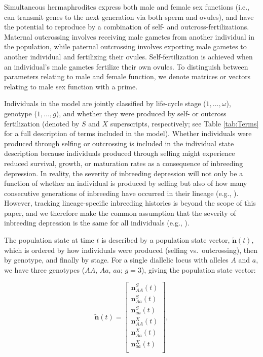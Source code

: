 \documentclass[11pt,draft]{article}
\def\mbf#1{\mathbf{#1}}
\begin{document}
Simultaneous hermaphrodites express both male and female sex functions (i.e., can transmit genes to the next generation via both sperm and ovules), and have the potential to reproduce by a combination of self- and outcross-fertilizations. Maternal outcrossing involves receiving male gametes from another individual in the population, while paternal outcrossing involves exporting male gametes to another individual and fertilizing their ovules. Self-fertilization is achieved when an individual's male gametes fertilize their own ovules. To distinguish between parameters relating to male and female function, we denote matrices or vectors relating to male sex function with a prime. 

Individuals in the model are jointly classified by life-cycle stage ($1, \ldots, \omega$), genotype ($1, \ldots, g$), and whether they were produced by self- or outcross fertilization (denoted by $S$ and $X$ superscripts, respectively; see Table \ref{tab:Terms} for a full description of terms included in the model). Whether individuals were produced through selfing or outcrossing is included in the individual state description because individuals produced through selfing might experience reduced survival, growth, or maturation rates as a consequence of inbreeding depression. In reality, the severity of inbreeding depression will not only be a function of whether an individual is produced by selfing but also of how many consecutive generations of inbreeding have occurred in their lineage (e.g., \citealt{kelly1999response, kelly2007mutation}). However, tracking lineage-specific inbreeding histories is beyond the scope of this paper, and we therefore make the common assumption that the severity of inbreeding depression is the same for all individuals (e.g., \citealt{Charlesworth1987, Charlesworth2009, Charlesworth2010,JordanConnallon2014}).

The population state at time $t$ is described by a population state vector, $\tilde{\mbf{n}}(t)$, which is ordered by how individuals were produced (selfing vs.~outcrossing), then by genotype, and finally by stage. For a single diallelic locus with alleles $A$ and $a$, we have three genotypes ($AA,\, Aa,\, aa$; $g = 3$), giving the population state vector:
\begin{linenomath*}
\begin{equation} \label{eq:PopStateVec}
	\tilde{\mbf{n}}(t) =  \left[
								\begin{array}{c}
									\mbf{n}^{S}_{AA}(t) \\
									\mbf{n}^{S}_{Aa}(t) \\
									\mbf{n}^{S}_{aa}(t) \\ \hline
									\mbf{n}^{X}_{AA}(t) \\
									\mbf{n}^{X}_{Aa}(t) \\
									\mbf{n}^{X}_{aa}(t) \\ 
						\end{array} \right],
\end{equation}
\end{linenomath*}
\end{document}
